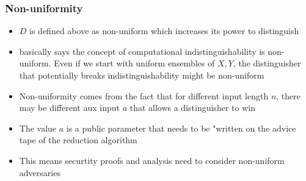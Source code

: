 \subsubsection*{Non-uniformity}
\begin{itemize}
    \item $D$ is defined above as non-uniform which increases its power to distinguish
    \item basically says the concept of computational indistinguishability is non-uniform. Even if we start with uniform ensembles of $X, Y$, the distinguisher that potentially breaks indistinguishability might be non-uniform
    \item Non-uniformity comes from the fact that for different input length $n$, there may be different aux input $a$ that allows a distinguisher to win
    \item The value $a$ is a public parameter that needs to be "written on the advice tape of the reduction algorithm
    \item This means securtity proofs and analysis need to consider non-uniform adversaries 
\end{itemize}

